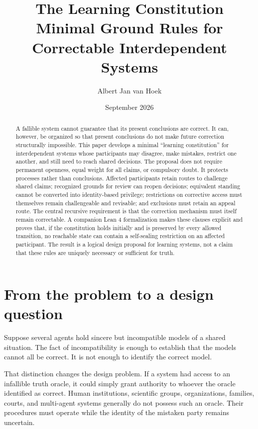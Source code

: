 \documentclass[11pt,a4paper]{article}
\title{\textbf{The Learning Constitution}\\\large Minimal Ground Rules for Correctable Interdependent Systems}
\author{Albert Jan van Hoek}
\date{September 2026}
\begin{document}
\maketitle

\begin{abstract}
A fallible system cannot guarantee that its present conclusions are correct. It can, however, be organized so that present conclusions do not make future correction structurally impossible. This paper develops a minimal ``learning constitution'' for interdependent systems whose participants may disagree, make mistakes, restrict one another, and still need to reach shared decisions. The proposal does not require permanent openness, equal weight for all claims, or compulsory doubt. It protects processes rather than conclusions. Affected participants retain routes to challenge shared claims; recognized grounds for review can reopen decisions; equivalent standing cannot be converted into identity-based privilege; restrictions on corrective access must themselves remain challengeable and revisable; and exclusions must retain an appeal route. The central recursive requirement is that the correction mechanism must itself remain correctable. A companion Lean 4 formalization makes these clauses explicit and proves that, if the constitution holds initially and is preserved by every allowed transition, no reachable state can contain a self-sealing restriction on an affected participant. The result is a logical design proposal for learning systems, not a claim that these rules are uniquely necessary or sufficient for truth.
\end{abstract}

\section{From the problem to a design question}

Suppose several agents hold sincere but incompatible models of a shared situation. The fact of incompatibility is enough to establish that the models cannot all be correct. It is not enough to identify the correct model.

That distinction changes the design problem. If a system had access to an infallible truth oracle, it could simply grant authority to whoever the oracle identified as correct. Human institutions, scientific groups, organizations, families, courts, and multi-agent systems generally do not possess such an oracle. Their procedures must operate while the identity of the mistaken party remains uncertain.
\end{document}
